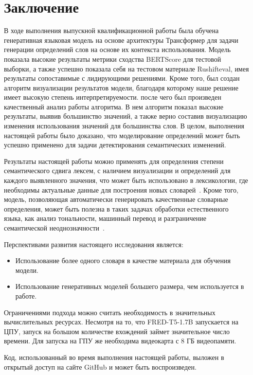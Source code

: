 \documentclass[LI,VKR]{HSEUniversity}
\begin{document}
\chapter*{Заключение}

В ходе выполнения выпускной квалификационной работы была обучена генеративная языковая модель
на основе архитектуры Трансформер для задачи генерации определений слов на основе их
контекста использования.
Модель показала высокие результаты метрики сходства BERTScore для тестовой выборки,
а также успешно показала себя на тестовом материале Rushifteval,
имея результаты сопоставимые с лидирующими решениями.
Кроме того, был создан алгоритм визуализации результатов модели,
благодаря которому наше решение имеет высокую степень интерпретируемости.
после чего был произведен качественный анализ работы алгоритма.
В нем алгоритм показал высокие результаты, выявив большинство значений,
а также верно составив визуализацию изменения использования значений для большинства слов.
В целом, выполнения настоящей работы было доказано, что моделирование определений может быть
успешно применено для задачи детектирования семантических изменений.

Результаты настоящей работы можно применять для определения степени семантического сдвига лексем,
с наличием визуализации и определений для каждого выявленного значения,
что может быть использовано в лексикологии,
где необходимы актуальные данные для построения новых словарей~\cite{DefinitionGenerationMainArticle}.
Кроме того, модель, позволяющая автоматически генерировать качественные словарные определения,
может быть полезна в таких задачах обработки естественного языка,
как анализ тональности, машинный перевод и разграничение семантической
неоднозначности~\cite{DefinitionModelingReviewAndDatasetAnalysis}.

Перспективами развития настоящего исследования является:
\begin{itemize}
    \item Использование более одного словаря в качестве материала для обучения модели.
    \item Использование генеративных моделей большего размера, чем используется в работе.
\end{itemize}

Ограничениями подхода можно считать необходимость в значительных вычислительных ресурсах.
Несмотря на то, что FRED-T5-1.7B запускается на ЦПУ, запуск на большом количестве вхождений
займет значительное число времени.
Для запуска на ГПУ же необходима видеокарта с 8 ГБ видеопамяти.

Код, использованный во время выполнения настоящей работы, выложен в открытый доступ
на сайте GitHub и может быть воспроизведен.~\cite{WorkGitHub}

\printbibliography
\appendix

\end{document}
